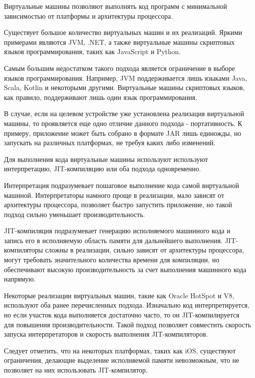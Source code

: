 Виртуальные машины позволяют выполнять код программ с минимальной зависимостью от платформы и архитектуры процессора.

Существует большое количество виртуальных машин и их реализаций.
Яркими примерами являются JVM, .NET, а также виртуальные машины скриптовых языков программирования, таких как JavaScript и Python.

Самым большим недостатком такого подхода является ограничение в выборе языков программирования. 
Например, JVM поддерживается лишь языками Java, Scala, Kotlin и некоторыми другими. 
Виртуальные машины скриптовых языков, как правило, поддерживают лишь один язык программирования.

В случае, если на целевом устройстве уже установлена реализация виртуальной машины, то проявляется еще одно отличие данного подхода - портативность. 
К примеру, приложение может быть собрано в формате JAR лишь единожды, но запускать на различных платформах, не требуя каких либо изменений.

Для выполнения кода виртуальные машины используют используют интерпретацию, JIT-компиляцию или оба подхода одновременно.

Интерпретация подразумевает пошаговое выполнение кода самой виртуальной машиной. Интерпретаторы намного проще в реализации, мало зависят от архитектуры процессора, позволяет быстро запустить приложение, но такой подход сильно уменьшает производительность.

JIT-компиляция подразумевает генерацию исполняемого машинного кода и запись его в исполняемую область памяти для дальнейшего выполнения.
JIT-компиляторы сложны в реализации, сильно зависят от архитектуры процессора, могут требовать значительного количества времени для компиляции, но обеспечивают высокую производительность за счет выполнения машинного кода напрямую.

Некоторые реализации виртуальных машин, такие как Oracle HotSpot и V8, используют оба  ранее перечисленных подхода. 
Изначально код интерпретируется, но если участок кода выполняется достаточно часто, то он JIT-компилируется для повышения производительности. 
Такой подход позволяет совместить скорость запуска интерпретаторов и скорость выполнения JIT-компиляторов.

Следует отметить, что на некоторых платформах, таких как iOS, существуют ограничения, делающие выделение исполняемой памяти невозможным, что не позволяет на них использовать JIT-компилятор. \cite{IOSJIT}
